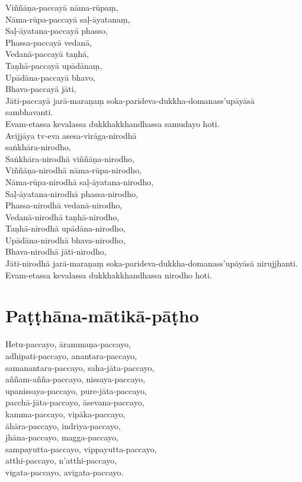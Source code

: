 Viññāṇa-paccayā nāma-rūpaṃ,\\
Nāma-rūpa-paccayā saḷ-āyatanaṃ,\\
Saḷ-āyatana-paccayā phasso,\\
Phassa-paccayā vedanā,\\
Vedanā-paccayā taṇhā,\\
Taṇhā-paccayā upādānaṃ,\\
Upādāna-paccayā bhavo,\\
Bhava-paccayā jāti,\\
Jāti-paccayā jarā-maraṇaṃ soka-parideva-dukkha-domanass'upāyāsā sambhavanti.\\
Evam-etassa kevalassa dukkhakkhandhassa samudayo hoti.\\
Avijjāya tv-eva asesa-virāga-nirodhā\\
saṅkhāra-nirodho,\\
Saṅkhāra-nirodhā viññāṇa-nirodho,\\
Viññāṇa-nirodhā nāma-rūpa-nirodho,\\
Nāma-rūpa-nirodhā saḷ-āyatana-nirodho,\\
Saḷ-āyatana-nirodhā phassa-nirodho,\\
Phassa-nirodhā vedanā-nirodho,\\
Vedanā-nirodhā taṇhā-nirodho,\\
Taṇhā-nirodhā upādāna-nirodho,\\
Upādāna-nirodhā bhava-nirodho,\\
Bhava-nirodhā jāti-nirodho,\\
Jāti-nirodhā jarā-maraṇaṃ soka-parideva-dukkha-domanass'upāyāsā nirujjhanti.\\
Evam-etassa kevalassa dukkhakkhandhassa nirodho hoti.

\chapter{Paṭṭhāna-mātikā-pāṭho}

Hetu-paccayo, ārammaṇa-paccayo,\\
adhipati-paccayo, anantara-paccayo,\\
samanantara-paccayo, saha-jāta-paccayo,\\
aññam-añña-paccayo, nissaya-paccayo,\\
upanissaya-paccayo, pure-jāta-paccayo,\\
pacchā-jāta-paccayo, āsevana-paccayo,\\
kamma-paccayo, vipāka-paccayo,\\
āhāra-paccayo, indriya-paccayo,\\
jhāna-paccayo, magga-paccayo,\\
sampayutta-paccayo, vippayutta-paccayo,\\
atthi-paccayo, n'atthi-paccayo,\\
vigata-paccayo, avigata-paccayo.

